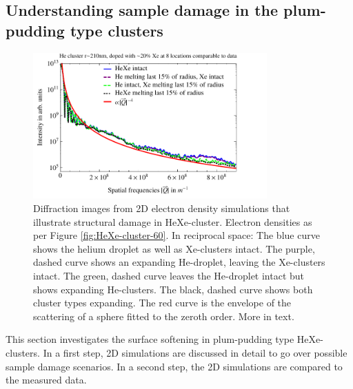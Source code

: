 \subsection{Understanding sample damage in the plum-pudding type clusters}\label{sec:helium-xenon-data}
\begin{figure}
	\centering
		\includegraphics[width=0.8\textwidth]{images/results/simulations-damage-explain2.pdf}
	\caption[Simulated structural damage scenarios in HeXe-clusters.]{Diffraction images from 2D electron density simulations that illustrate structural damage in HeXe-cluster. Electron densities as per Figure \ref{fig:HeXe-cluster-60}. In reciprocal space: The blue curve shows the helium droplet as well as Xe-clusters intact. The purple, dashed curve shows an expanding He-droplet, leaving the Xe-clusters intact. The green, dashed curve leaves the He-droplet intact but shows expanding He-clusters. The black, dashed curve shows both cluster types expanding. The red curve is the envelope of the scattering of a sphere fitted to the zeroth order. More in text.}
	\label{fig:simulations-damage-explain}
\end{figure}
%
This section investigates the surface softening in plum-pudding type HeXe-clusters. In a first step, 2D simulations are discussed in detail to go over possible sample damage scenarios. In a second step, the 2D simulations are compared to the measured data.
